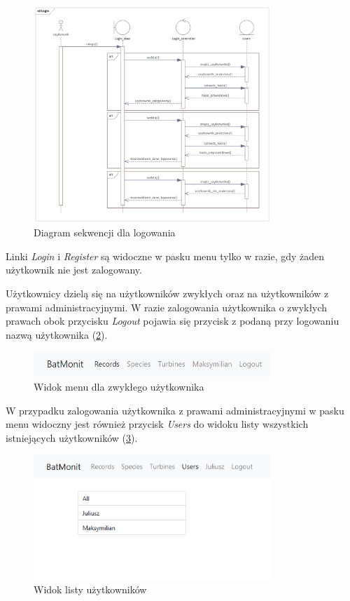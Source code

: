 \documentclass{sprz}
\begin{document}
\begin{figure}[h]
  \centering
  \includegraphics[width=0.8\textwidth]{sprz/sequence_login}
  \caption{Diagram sekwencji dla logowania}
  \label{img:sequence_login}
\end{figure}

Linki \textit{Login} i \textit{Register} są widoczne w pasku menu tylko w razie, gdy żaden użytkownik nie jest zalogowany.

Użytkownicy dzielą się na użytkowników zwykłych oraz na użytkowników z prawami administracyjnymi. W razie zalogowania użytkownika o zwykłych prawach obok przycisku \textit{Logout} pojawia się przycisk z podaną przy logowaniu nazwą użytkownika (\ref{img:app_menu_regular_user}).

\begin{figure}[h]
  \centering
  \includegraphics[width=0.8\textwidth]{sprz/app_menu_regular_user}
  \caption{Widok menu dla zwykłego użytkownika}
  \label{img:app_menu_regular_user}
\end{figure}

W przypadku zalogowania użytkownika z prawami administracyjnymi w pasku menu widoczny jest również przycisk \textit{Users} do widoku listy wszystkich istniejących użytkowników (\ref{img:app_users}).

\begin{figure}[h]
  \centering
  \includegraphics[width=0.8\textwidth]{sprz/app_users}
  \caption{Widok listy użytkowników}
  \label{img:app_users}
\end{figure}
\end{document}
